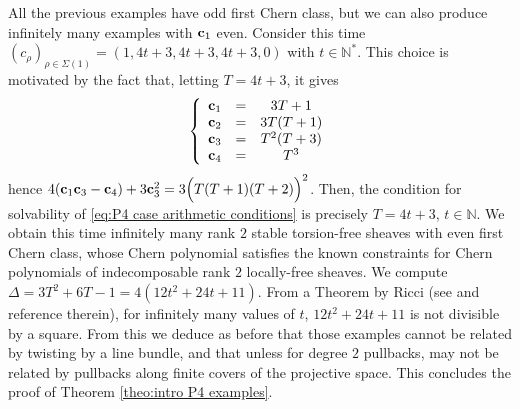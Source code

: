 \documentclass[a4paper,10pt]{amsart}
\theoremstyle{plain}{
    \newtheorem{theorem}{Theorem}[section]
    \newtheorem{lemma}[theorem]{Lemma}
    \newtheorem{corollary}[theorem]{Corollary}
    \newtheorem{proposition}[theorem]{Proposition}
    \newtheorem{conjecture}[theorem]{Conjecture}
}
\theoremstyle{definition}{
    \newtheorem{definition}[theorem]{Definition}
    \newtheorem{defn-thm}[theorem]{Definition-Theorem}
    \newtheorem{example}[theorem]{Example}
    \newtheorem{notation}[theorem]{Notation}
}
\theoremstyle{remark}{
    \newtheorem{remark}[theorem]{Remark}
    \newtheorem{problem}[theorem]{Problem}
    \newtheorem{question}[theorem]{Question}
}
\def\uc{{\bf c}}
\def\N{\mathbb{N}}
\begin{document}
All the previous examples have odd first Chern class, but we can also produce infinitely many examples with $\uc_1$ even. Consider this time $(c_\rho)_{\rho\in\Sigma(1)}=(1,4t+3,4t+3,4t+3,0)$ with $t\in\N^*$. This choice is motivated by the fact that, letting $T=4t+3$, it gives
$$
\left\{
\begin{array}{ccc}
\uc_1 & = & 3T+1  \\
\uc_2 & = & 3T(T+1)\\ 
\uc_3 & = & T^2(T+3)\\
\uc_4  & = & T^3 
\end{array}
\right.
$$
hence $4(\uc_1\uc_3-\uc_4)+3\uc_3^2 =3\Big(T(T+1)(T+2)\Big)^2$. Then, the condition for solvability of \eqref{eq:P4 case arithmetic conditions} is precisely $T=4t+3$, $t\in\N$. We obtain this time infinitely many rank $2$ stable torsion-free sheaves with even first Chern class, whose Chern polynomial satisfies the known constraints for Chern polynomials of indecomposable rank $2$ locally-free  sheaves. We compute $\Delta=3T^2+6T-1=4(12t^2+24t+11)$. From a Theorem by Ricci (see \cite{Rud} and reference therein), for infinitely many values of $t$, $12t^2+24t+11$
is not divisible by a square. From this we deduce as before that those examples cannot be related by twisting by a line bundle, and that unless for degree $2$ pullbacks, may not be related by pullbacks along finite covers of the projective space. This concludes the proof of Theorem \ref{theo:intro P4 examples}.
\end{document}
